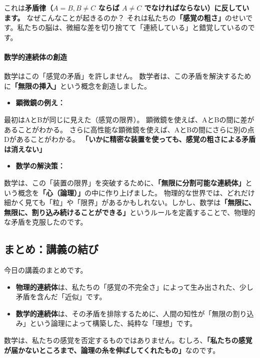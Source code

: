 \documentclass[a4paper,11pt,openany]{ltjsbook}
\begin{document}
\begin{lecturebox}
これは\textbf{矛盾律（$A=B, B \neq C$ ならば $A \neq C$ でなければならない）に反しています。}
なぜこんなことが起きるのか？ それは私たちの\textbf{「感覚の粗さ」}のせいです。私たちの脳は、微細な差を切り捨てて「連続している」と錯覚しているのです。

\paragraph{数学的連続体の創造}
数学はこの「感覚の矛盾」を許しません。
数学者は、この矛盾を解決するために\textbf{「無限の挿入」}という概念を創造しました。

\begin{itemize}[leftmargin=2em]
\item \textbf{顕微鏡の例え：}
\end{itemize}
    最初はAとBが同じに見えた（感覚の限界）。
    顕微鏡を使えば、AとBの間に差があることがわかる。
    さらに高性能な顕微鏡を使えば、AとBの間にさらに別の点Dがあることがわかる。
    \textbf{「いかに精密な装置を使っても、感覚の粗さによる矛盾は消えない」}

\begin{itemize}[leftmargin=2em]
\item \textbf{数学の解決策：}
\end{itemize}
    数学は、この「装置の限界」を突破するために、\textbf{「無限に分割可能な連続体」}という概念を\textbf{「心（論理）」}の中に作り上げました。
    物理的な世界では、どれだけ細かく見ても「粒」や「限界」があるかもしれない。しかし、数学は\textbf{「無限に、無限に、割り込み続けることができる」}というルールを定義することで、物理的な矛盾を克服したのです。

\subsection*{まとめ：講義の結び}

今日の講義のまとめです。

\begin{itemize}[leftmargin=2em]
\item \textbf{物理的連続体}は、私たちの「感覚の不完全さ」によって生み出された、少し矛盾を含んだ「近似」です。
\item \textbf{数学的連続体}は、その矛盾を排除するために、人間の知性が「無限の割り込み」という論理によって構築した、純粋な「理想」です。
\end{itemize}

数学は、私たちの感覚を否定するものではありません。むしろ、\textbf{「私たちの感覚が届かないところまで、論理の糸を伸ばしてくれたもの」}なのです。


\end{lecturebox}
\end{document}

